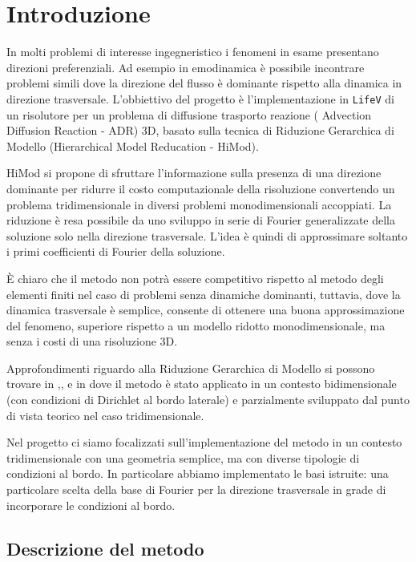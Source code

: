 \chapter{Introduzione}

In molti problemi di interesse ingegneristico i fenomeni in esame presentano
direzioni preferenziali. Ad esempio in emodinamica \`e possibile incontrare problemi
simili dove la direzione del flusso \`e dominante rispetto alla dinamica
in direzione trasversale.
L'obbiettivo del progetto \`e l'implementazione in \texttt{LifeV} di un 
risolutore per un problema di diffusione trasporto reazione ( Advection Diffusion 
Reaction - ADR) 3D, basato sulla tecnica di Riduzione Gerarchica di Modello
(Hierarchical Model Reducation - HiMod).

HiMod si propone di sfruttare l'informazione
sulla presenza di una direzione dominante per ridurre il costo computazionale
della risoluzione convertendo un problema tridimensionale
in diversi problemi monodimensionali accoppiati.
La riduzione \`e resa possibile da uno sviluppo in serie di 
Fourier generalizzate della soluzione solo nella direzione trasversale. 
L'idea \`e quindi di approssimare soltanto i primi coefficienti di Fourier della soluzione.

\`E chiaro che il metodo non potr\`a essere competitivo rispetto al
metodo degli elementi finiti nel caso di problemi senza dinamiche dominanti,
tuttavia, dove la dinamica trasversale \`e semplice, consente di ottenere
una buona approssimazione del fenomeno, superiore rispetto a un modello
ridotto monodimensionale, ma senza i costi di una risoluzione 3D.

Approfondimenti riguardo alla Riduzione Gerarchica di Modello si possono trovare in
\cite{perotto:2008},\cite{perotto:2009},\cite{perotto:2012} e in \cite{zilio:himod} dove il metodo \`e stato 
applicato in un contesto bidimensionale (con condizioni di Dirichlet al bordo laterale) e parzialmente sviluppato dal punto di vista
teorico nel caso tridimensionale.

Nel progetto ci siamo focalizzati sull'implementazione del metodo in un contesto 
tridimensionale con una geometria semplice, ma con diverse tipologie di condizioni al bordo.
In particolare abbiamo implementato le basi istruite: una particolare scelta della base di Fourier
per la direzione trasversale in grade di incorporare le condizioni al bordo.


\section{Descrizione del metodo}


